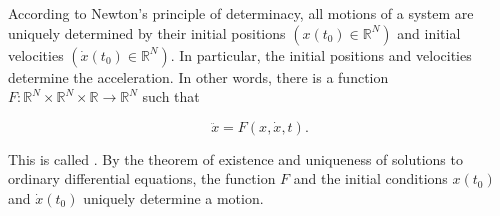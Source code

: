 According to Newton's principle of determinacy, all motions of a system are uniquely determined by their initial positions $(x(t_0) \in \mathbb{R}^N)$ and initial velocities $(\dot{x}(t_0) \in \mathbb{R}^N)$. In particular, the initial positions and velocities determine the acceleration. In other words, there is a function $F: \mathbb{R}^N \times \mathbb{R}^N \times \mathbb{R} \rightarrow \mathbb{R}^N$ such that

$$\ddot{x} = F(x, \dot{x}, t).$$

This is called . By the theorem of existence and uniqueness of solutions to ordinary differential equations, the function $F$ and the initial conditions $x(t_0)$ and $\dot{x}(t_0)$ uniquely determine a motion.
